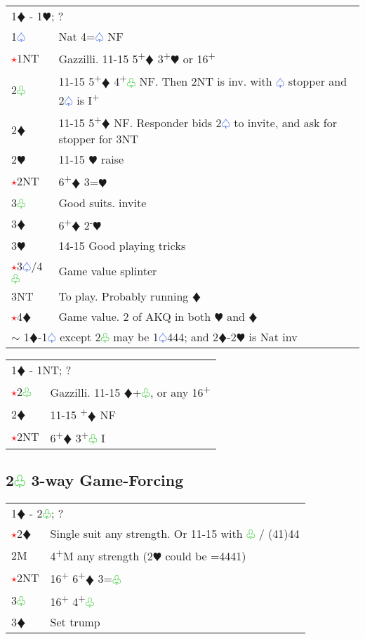 \documentclass{article}
\renewcommand{\sp}{\textcolor{RoyalBlue}{$\varspade$}}
\newcommand{\he}{\textcolor{RubineRed}{$\varheart$}}
\newcommand{\di}{\textcolor{Peach}{$\vardiamond$}}
\newcommand{\cl}{\textcolor{LimeGreen}{$\varclub$}}
\newcommand{\nt}{\relsize{-1}NT\relsize{1}}
\newcommand{\up}{\textsuperscript{+}}
\newcommand{\down}{\textsuperscript{-}}
\newcommand{\al}{\textcolor{red}{$\star$}}
\begin{document}
\begin{tabular}{|l|p{6.5cm}}
	\multicolumn{2}{l}{1\di{} - 1\he{}; ?}\\
	1\sp{} & Nat 4=\sp{} NF \\
	\al{}1\nt & Gazzilli. 11-15 5\up{}\di{} 3\up{}\he{} or 16\up{}\\
	2\cl{} & 11-15 5\up\di{} 4\up\cl{} NF. Then 2\nt{} is inv. with \sp{} stopper and 2\sp{} is I\up{} \\
	2\di{} & 11-15 5\up\di{} NF. Responder bids 2\sp{} to invite, and ask for stopper for 3\nt \\
	2\he{}& 11-15 \he{} raise \\
	\al{}2\nt &  6\up{}\di{} 3={}\he{} \\
	3\cl{} & Good suits. invite \\
	3\di{} & 6\up{}\di{} 2\down{}\he{} \\
	3\he{} & 14-15 Good playing tricks \\
	\al{}3\sp{}/4\cl{} & Game value splinter \\
	3\nt{} & To play. Probably running \di{} \\
	\al{}4\di{} & Game value. 2 of AKQ in both \he{} and \di{} \\
	\multicolumn{2}{l}{$\sim$ 1\di{}-1\sp{} except 2\cl{} may be 1\sp{}444; and 2\di{}-2\he{} is Nat inv}
\end{tabular}

\medskip

\begin{tabular}{|l|p{6.5cm}}
	\multicolumn{2}{l}{1\di{} - 1\nt{}; ?}\\
	\al{}2\cl{} & Gazzilli. 11-15 \di{}+\cl{}, or any 16\up \\
    2\di{} & 11-15 \up\di{} NF \\
    \al{}2\nt{} & 6\up{}\di{} 3\up{}\cl{} I \\
\end{tabular}


\subsection{2\cl{} 3-way Game-Forcing}

\begin{tabular}{|l|p{6.5cm}}
	\multicolumn{2}{l}{1\di{} - 2\cl{}; ?} \\
	\al{}2\di{} & Single suit any strength. Or 11-15 with \cl{} / (41)44 \\
	2M & 4\up{}M any strength (2\he{} could be =4441) \\
	\al{}2\nt{} & 16\up{} 6\up\di{} 3=\cl{} \\
	3\cl{} & 16\up{} 4\up{}\cl{} \\
	3\di{} & Set trump \\
\end{tabular}
\end{document}
